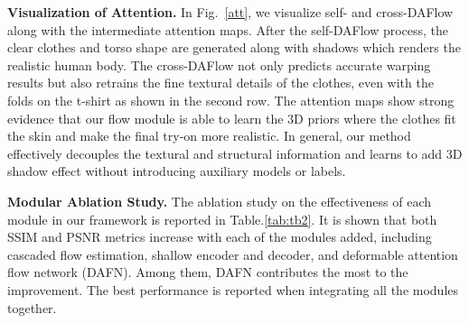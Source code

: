 \documentclass[runningheads]{llncs}
\begin{document}
\begin{table*}[t]

\end{table*}

\textbf{Visualization of Attention.} In Fig.~\ref{att}, we visualize self- and cross-DAFlow along with the intermediate attention maps. After the self-DAFlow process, the clear clothes and torso shape are generated along with shadows which renders the realistic human body. The cross-DAFlow not only predicts accurate warping results but also retrains the fine textural details of the clothes, even with the folds on the t-shirt as shown in the second row. The attention maps show strong evidence that our flow module is able to learn the 3D priors where the clothes fit the skin and make the final try-on more realistic. In general, our method effectively decouples the textural and structural information and learns to add 3D shadow effect without introducing auxiliary models or labels.


\textbf{Modular Ablation Study.} 
The ablation study on the effectiveness of each module in our framework is reported in Table.\ref{tab:tb2}. It is shown that both SSIM and PSNR metrics increase with each of the modules added, including cascaded flow estimation, shallow encoder and decoder, and deformable attention flow network (DAFN). Among them, DAFN contributes the most to the improvement. The best performance is reported when integrating all the modules together.
\end{document}
